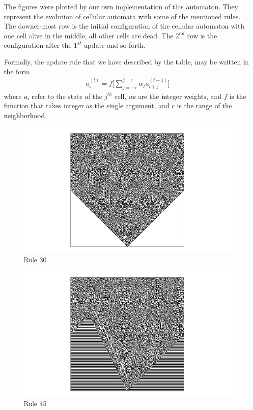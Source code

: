 \begin{enumerate}
The figures were plotted by our own implementation of this automaton.
They represent the evolution of cellular automata with some of the mentioned rules.
The downer-most row is the initial configuration of the cellular automaton with one cell alive in the middle, all other cells are dead.
The $2^{nd}$ row is the configuration after the $1^{st}$ update and so forth.

Formally, the update rule that we have described by the table, may be written in the form
\begin{align} \label{rule1}
a_i^{(t)} = f \big[ \sum_{j=-r}^{j=r} \alpha_j a_{i+j}^{(t-1)} \big]
\end{align}
where $a_i$ refer to the state of the $j^{th}$ cell, $\alpha$s are the integer weights, and $f$ is the function that takes integer as the single argument, and $r$ is the range of the neighborhood.
\end{enumerate}

\begin{figure}[!t]
 \centering
 \includegraphics[trim = 40mm 0mm 0mm 0mm, width=1.7\textwidth]{./img/30_500}
 \caption{Rule 30}
 \label{rule30}
\end{figure}

\begin{figure}[!b]
 \centering
 \includegraphics[trim = 40mm 0mm 0mm 0mm, width=1.7\textwidth]{./img/45_500}
 \caption{Rule 45}
\end{figure}

